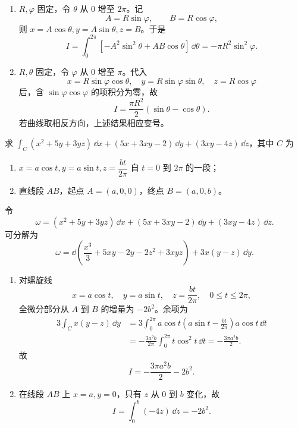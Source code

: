 \begin{xsolution}
\begin{enumerate}[label=(\arabic*)]
\item $R,\varphi$ 固定，令 $\theta$ 从 $0$ 增至 $2\pi$。记
\[
  A=R\sin\varphi,\qquad B=R\cos\varphi,
\]
则 $x=A\cos\theta,y=A\sin\theta,z=B$。于是
\[
  I=\int_0^{2\pi}\left[-A^2\sin^2\theta+AB\cos\theta\right]\,\dd\theta
  =-\pi R^2\sin^2\varphi.
\]

\item $R,\theta$ 固定，令 $\varphi$ 从 $0$ 增至 $\pi$。代入
\[
  x=R\sin\varphi\cos\theta,
  \quad y=R\sin\varphi\sin\theta,
  \quad z=R\cos\varphi
\]
后，含 $\sin\varphi\cos\varphi$ 的项积分为零，故
\[
  I=\frac{\pi R^2}{2}(\sin\theta-\cos\theta).
\]
若曲线取相反方向，上述结果相应变号。
\end{enumerate}
\end{xsolution}
\begin{xexercise}[7]
求 $\displaystyle\int_C(x^2+5y+3yz)\,\dd x+(5x+3xy-2)\,\dd y+(3xy-4z)\,\dd z$，其中 $C$ 为
\begin{enumerate}[label=(\arabic*)]
  \item $x=a\cos t,y=a\sin t,z=\dfrac{bt}{2\pi}$ 自 $t=0$ 到 $2\pi$ 的一段；
  \item 直线段 $AB$，起点 $A=(a,0,0)$，终点 $B=(a,0,b)$。
\end{enumerate}
\end{xexercise}
\begin{xsolution}
令
\[
  \omega=(x^2+5y+3yz)\,\dd x+(5x+3xy-2)\,\dd y+(3xy-4z)\,\dd z.
\]
可分解为
\[
  \omega=\dd\left(\frac{x^3}{3}+5xy-2y-2z^2+3xyz\right)
  +3x(y-z)\,\dd y.
\]
\begin{enumerate}[label=(\arabic*)]
\item 对螺旋线
\[
  x=a\cos t,\quad y=a\sin t,\quad z=\frac{bt}{2\pi},\quad0\le t\le2\pi,
\]
全微分部分从 $A$ 到 $B$ 的增量为 $-2b^2$。余项为
\begin{align*}
  3\int_Cx(y-z)\,\dd y
  &=3\int_0^{2\pi}a\cos t
    \left(a\sin t-\frac{bt}{2\pi}\right)a\cos t\,\dd t\\
  &=-\frac{3a^2b}{2\pi}\int_0^{2\pi}t\cos^2t\,\dd t
   =-\frac{3\pi a^2b}{2}.
\end{align*}
故
\[
  I=-\frac{3\pi a^2b}{2}-2b^2.
\]

\item 在线段 $AB$ 上 $x=a,y=0$，只有 $z$ 从 $0$ 到 $b$ 变化，故
\[
  I=\int_0^b(-4z)\,\dd z=-2b^2.
\]
\end{enumerate}
\end{xsolution}
